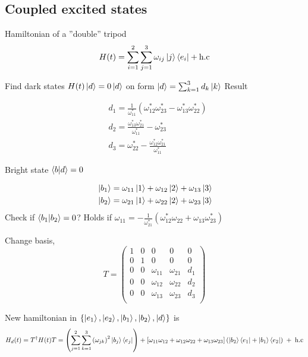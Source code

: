\subsection{Coupled excited states}
Hamiltonian of a ''double'' tripod
\begin{equation}
H(t) = \sum^2_{i = 1} \sum^3_{j = 1} \omega_{ij} \ket{j}\bra{e_i} + \text{h.c}
\end{equation}

Find dark states $H(t)\ket{d} = 0\ket{d} $ on form $\ket{d} = \sum_{k = 1}^3 d_k \ket{k}$
Result

\begin{equation}
\begin{aligned} &
d_1 = \frac{1}{\omega^{*}_{11}} \left(\omega^{*}_{12}\omega^{*}_{23}  - \omega^{*}_{13}\omega^{*}_{22} \right)
\\ &
d_2 = \frac{\omega^{*}_{13}\omega^{*}_{21}}{\omega^{*}_{11}} - \omega^{*}_{23}
\\ &
d_3 = \omega^{*}_{22} - \frac{\omega^{*}_{12}\omega^{*}_{21}}{\omega^{*}_{11}}
\end{aligned}
\end{equation}

Bright state $\bra{b}\ket{d} = 0$ 

\begin{equation}
\begin{aligned} &
\ket{b_1} = \omega_{11}\ket{1} + \omega_{12}\ket{2} + \omega_{13}\ket{3}
\\ &
\ket{b_2} = \omega_{21}\ket{1} + \omega_{22}\ket{2} + \omega_{23}\ket{3}
\end{aligned}
\end{equation}
Check if $\bra{b_1}\ket{b_2} = 0$? Holds if $\omega_{11} = -\frac{1}{\omega^{*}_{21}}\left(\omega^{*}_{12}\omega_{22} + \omega_{13}\omega^{*}_{23} \right)$


Change basis, 
\begin{equation}
T = \begin{pmatrix}
1 & 0 & 0 & 0 & 0 \\
0 & 1 & 0 & 0 & 0  \\
0 & 0 & \omega_{11} & \omega_{21} & d_1  \\
0 & 0 & \omega_{12} & \omega_{22} & d_2  \\
0 & 0 & \omega_{13} & \omega_{23} & d_3  \\
\end{pmatrix}
\end{equation}

New hamiltonian in $\{\ket{e_1}, \ket{e_2}, \ket{b_1}, \ket{b_2}, \ket{d} \}$ is 
\begin{equation}
H_d(t) = T^\dagger H(t) T = \left(\sum_{j = 1}^2 \sum_{k = 1}^3 \left( \omega_{jk} \right)^2 \ket{b_j}\bra{e_j}\right) + \left[\omega_{11}\omega_{12} + \omega_{12}\omega_{22} + \omega_{13}\omega_{23} \right]\left(\ket{b_2}\bra{e_1} + \ket{b_1}\bra{e_2}\right)\; + \;\text{h.c} 
\end{equation} 


